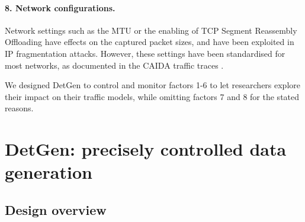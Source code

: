 \documentclass[runningheads]{llncs}
\begin{document}
\paragraph{8. Network configurations.}
Network settings such as the MTU or the enabling of TCP Segment Reassembly Offloading have effects on the captured packet sizes, and have been exploited in IP fragmentation attacks. However, these settings have been standardised for most networks, as documented in the CAIDA traffic traces \cite{walsworth2015caida}.




\vspace{0.3cm}
We designed DetGen to control and monitor factors 1-6 to let researchers explore their impact on their traffic models, while omitting factors 7 and 8 for the stated reasons.

\section{DetGen: precisely controlled data generation}\label{Sec:Archi}





\subsection{Design overview}
\end{document}
